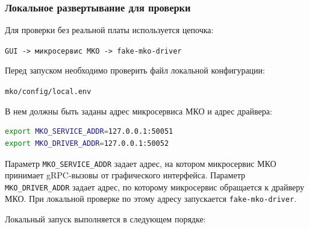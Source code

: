 \subsubsection{Локальное развертывание для проверки}

Для проверки без реальной платы используется цепочка:

\begin{center}
	\texttt{GUI -> микросервис МКО -> fake-mko-driver}
\end{center}

Перед запуском необходимо проверить файл локальной конфигурации:

\begin{center}
	\texttt{mko/config/local.env}
\end{center}

В нем должны быть заданы адрес микросервиса МКО и адрес драйвера:

\begin{lstlisting}[language=bash]
export MKO_SERVICE_ADDR=127.0.0.1:50051
export MKO_DRIVER_ADDR=127.0.0.1:50052
\end{lstlisting}

Параметр \texttt{MKO\_SERVICE\_ADDR} задает адрес, на котором микросервис МКО принимает gRPC-вызовы от графического интерфейса. Параметр \texttt{MKO\_DRIVER\_ADDR} задает адрес, по которому микросервис обращается к драйверу МКО. При локальной проверке по этому адресу запускается \texttt{fake-mko-driver}.

Локальный запуск выполняется в следующем порядке:

